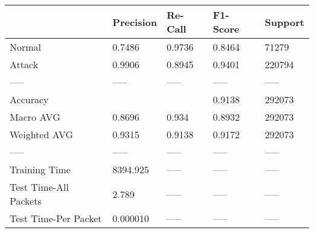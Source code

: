 \begin{tabular}{lllll}
\toprule
{} & Precision & Re-Call & F1-Score & Support \\
\midrule
Normal                &    0.7486 &  0.9736 &   0.8464 &   71279 \\
Attack                &    0.9906 &  0.8945 &   0.9401 &  220794 \\
-----                 &     ----- &   ----- &    ----- &   ----- \\
Accuracy              &           &         &   0.9138 &  292073 \\
Macro AVG             &    0.8696 &   0.934 &   0.8932 &  292073 \\
Weighted AVG          &    0.9315 &  0.9138 &   0.9172 &  292073 \\
-----                 &     ----- &   ----- &    ----- &   ----- \\
Training Time         &  8394.925 &   ----- &    ----- &   ----- \\
Test Time-All Packets &     2.789 &   ----- &    ----- &   ----- \\
Test Time-Per Packet  &  0.000010 &   ----- &    ----- &   ----- \\
\bottomrule
\end{tabular}
